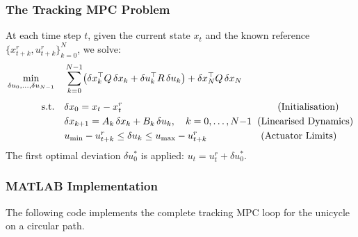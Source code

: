 \subsubsection*{The Tracking MPC Problem}

At each time step $t$, given the current state $x_t$ and the known reference $\{x^r_{t+k}, u^r_{t+k}\}_{k=0}^{N}$, we solve:
\begin{align*}
	\min_{\delta u_0, \dots, \delta u_{N-1}} \quad & \sum_{k=0}^{N-1} \bigl(\delta x_k^\top Q\,\delta x_k + \delta u_k^\top R\,\delta u_k\bigr) + \delta x_N^\top Q\,\delta x_N \\[4pt]
	\text{s.t.} \quad
	& \delta x_0 = x_t - x^r_t \hspace{5.6cm} \text{(Initialisation)} \\
	& \delta x_{k+1} = A_k\,\delta x_k + B_k\,\delta u_k, \quad k = 0, \dots, N{-}1 \hspace{0.2cm} \text{(Linearised Dynamics)} \\
	& u_{\min} - u^r_{t+k} \le \delta u_k \le u_{\max} - u^r_{t+k} \hspace{1.95cm} \text{(Actuator Limits)}
\end{align*}
The first optimal deviation $\delta u_0^*$ is applied: $u_t = u^r_t + \delta u_0^*$.

\subsubsection*{MATLAB Implementation}

The following code implements the complete tracking MPC loop for the unicycle on a circular path.

